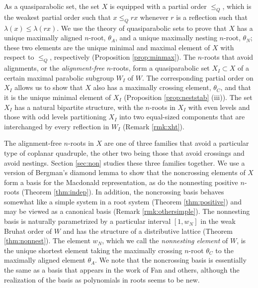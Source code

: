 \documentclass[11pt]{amsart}
\theoremstyle{plain}
\theoremstyle{definition}
\theoremstyle{remark}
\numberwithin{equation}{subsection}
\begin{document}
As a quasiparabolic set, the set $X$ is equipped with a partial order $\le_Q$,
which is the weakest partial order such that $x\le_Q rx$ whenever $r$ is a
reflection such that $\lambda(x)\le\lambda(rx)$. We use the theory of
quasiparabolic sets to prove that $X$ has a unique maximally aligned $n$-root,
$\theta_A$, and a unique maximally nesting $n$-root, $\theta_N$; these two
elements are the unique minimal and maximal element of $X$ with respect to
$\le_Q$, respectively (Proposition \ref{prop:minmax}).  The $n$-roots that avoid
alignments, or the \emph{alignment-free} $n$-roots, form a quasiparabolic set
$X_I \subset X$ of a certain maximal parabolic subgroup $W_I$ of $W$. The
corresponding partial order on $X_I$ allows us to show that $X$ also has a
maximally crossing element, $\theta_C$, and that it is the unique minimal
element of $X_I$ (Proposition \ref{prop:neststab} (iii)). The set $X_I$ has a
natural bipartite structure, with the $n$-roots in $X_I$ with even levels and
those with odd levels partitioning $X_I$ into two equal-sized components that
are interchanged by every reflection in $W_I$ (Remark \ref{rmk:xht}).

The alignment-free $n$-roots in $X$ are one of three families that avoid a
particular type of coplanar quadruple, the other two being those that avoid
crossings and avoid nestings. Section \ref{sec:non} studies these three families
together. We use a version of Bergman's diamond lemma to show that the
noncrossing elements of $X$ form a basis for the Macdonald representation, as do
the nonnesting positive $n$-roots (Theorem \ref{thm:indep}). In addition, the
noncrossing basis behaves somewhat like a
simple system in a root system (Theorem \ref{thm:positive}) and may be viewed as
a canonical basis (Remark \ref{rmk:othersimple}).  The nonnesting
basis is naturally parametrized by a particular interval $[1, w_N]$ in the weak
Bruhat order of $W$ and has the structure of a distributive lattice (Theorem
\ref{thm:nonnest}). The element $w_N$, which we call the \emph{nonnesting
element} of $W$, is the unique shortest element taking the maximally crossing
$n$-root $\theta_C$ to the maximally aligned element $\theta_A$.  We note that
the {noncrossing basis} is essentially the same as a basis that appears in the
work of Fan \cite[Section 6]{fan97} and others, although the realization of the
basis as polynomials in roots seems to be new.
\end{document}
